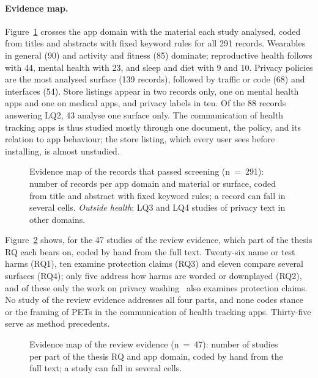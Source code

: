 \paragraph{Evidence map.} Figure~\ref{fig:lit-map-surfaces} crosses the app
domain with the material each study analysed, coded from titles and abstracts
with fixed keyword rules for all 291 records. Wearables in general (90) and
activity and fitness (85) dominate; reproductive health follows with 44,
mental health with 23, and sleep and diet with 9 and 10. Privacy policies are
the most analysed surface (139 records), followed by traffic or code (68) and
interfaces (54). Store listings appear in two records only, one on mental
health apps and one on medical apps, and privacy labels in ten. Of the 88
records answering LQ2, 43 analyse one surface only. The communication of health
tracking apps is thus studied mostly through one document, the policy, and its
relation to app behaviour; the store listing, which every user sees before
installing, is almost unstudied.

\begin{figure}[tbp]
\centering

\caption[Evidence map: app domain and material studied]{Evidence map of the
records that passed screening (n~=~291): number of records per app domain and
material or surface, coded from title and abstract with fixed keyword rules;
a record can fall in several cells. \emph{Outside health}: LQ3 and LQ4 studies
of privacy text in other domains.}
\label{fig:lit-map-surfaces}
\end{figure}

Figure~\ref{fig:lit-map-rq} shows, for the 47 studies of the review evidence,
which part of the thesis RQ each bears on, coded by hand from the full text.
Twenty-six name or test harms (RQ1), ten examine protection claims (RQ3) and
eleven compare several surfaces (RQ4); only five address how harms are worded
or downplayed (RQ2), and of these only the work on privacy
washing~\parencite{brackin2026privacy} also examines protection claims. No study of the review evidence
addresses all four parts, and none codes stance or the framing of PETs in
the communication of health tracking apps. Thirty-five serve as method
precedents.

\begin{figure}[tbp]
\centering

\caption[Evidence map: parts of the RQ and app domain]{Evidence map of the
review evidence (n~=~47): number of studies per part of the thesis RQ and app
domain, coded by hand from the full text; a study can fall in several cells.}
\label{fig:lit-map-rq}
\end{figure}

